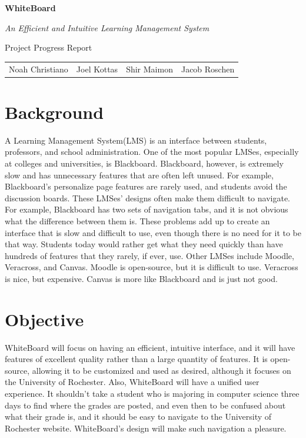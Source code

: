 \documentclass{article}
\begin{document}
\begin{center}

    \huge{\textbf{WhiteBoard}}

    \huge{\textit{An Efficient and Intuitive Learning Management System}}

    \huge{Project Progress Report}

    \vspace{10 pt}

    \large{
        \begin{tabular}{cccc}
            Noah Christiano&Joel Kottas&Shir Maimon&Jacob Roschen\\
        \end{tabular}
    }

\end{center}

\vspace{10 pt}

\section{Background}

A Learning Management System(LMS) is an interface between students, professors,
and school administration. One of the most popular LMSes, especially at
colleges and universities, is Blackboard\cite{Blackboard}. Blackboard, however,
is extremely slow and has unnecessary features that are often left unused. For
example, Blackboard's personalize page features are rarely used, and students
avoid the discussion boards. These LMSes' designs often make them difficult to
navigate. For example, Blackboard has two sets of navigation tabs, and it is
not obvious what the difference between them is. These problems add up to
create an interface that is slow and difficult to use, even though there is no
need for it to be that way. Students today would rather get what they need
quickly than have hundreds of features that they rarely, if ever, use. Other
LMSes include Moodle\cite{Moodle}, Veracross\cite{Veracross}, and
Canvas\cite{Canvas}. Moodle is open-source, but it is difficult to use.
Veracross is nice, but expensive. Canvas is more like Blackboard and is just
not good.

\section{Objective}

WhiteBoard will focus on having an efficient, intuitive interface, and it will
have features of excellent quality rather than a large quantity of features. It
is open-source, allowing it to be customized and used as desired, although it
focuses on the University of Rochester. Also, WhiteBoard will have a unified
user experience. It shouldn't take a student who is majoring in computer
science three days to find where the grades are posted, and even then to be
confused about what their grade is, and it should be easy to navigate to the
University of Rochester website. WhiteBoard's design will make such navigation
a pleasure.
\end{document}
